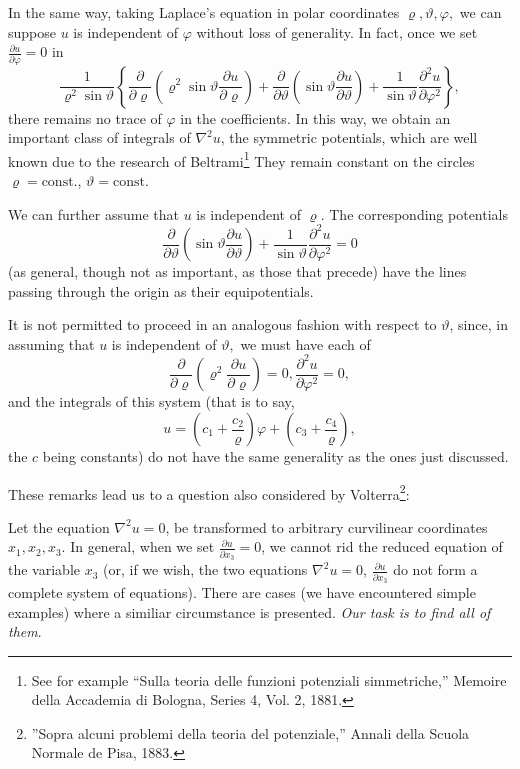 \documentclass{book}
\begin{document}
In the same way, taking Laplace's equation in polar coordinates $\varrho,\vartheta,\varphi,$ we can suppose $u$ is independent of $\varphi$ without loss of generality. In fact, once we set $\displaystyle\frac{\partial u}{\partial\varphi}=0$ in
$$\frac{1}{\varrho^2\sin\vartheta}\left\{\frac{\partial}{\partial\varrho}\left(\varrho^2\sin\vartheta\frac{\partial u}{\partial\varrho}\right)+\frac{\partial}{\partial\vartheta}\left(\sin\vartheta\frac{\partial u}{\partial\vartheta}\right)+\frac{1}{\sin\vartheta}\frac{\partial^2u}{\partial\varphi^2}\right\},$$ 
there remains no trace of $\varphi$ in the coefficients. In this way, we obtain an important class of integrals of $\nabla^2u$, the symmetric potentials, which are well known due to the research of Beltrami\footnote{See for example ``Sulla teoria delle funzioni potenziali simmetriche,'' Memoire della Accademia di Bologna, Series 4, Vol. 2, 1881.} They remain constant on the circles $\varrho=\text{const.}$, $\vartheta=\text{const.}$ 

We can further assume that $u$ is independent of $\varrho.$ The corresponding potentials 
$$\frac{\partial}{\partial\vartheta}\left(\sin\vartheta\frac{\partial u}{\partial\vartheta}\right)+\frac{1}{\sin\vartheta}\frac{\partial^2u}{\partial\varphi^2}=0$$
(as general, though not as important, as those that precede) have the lines passing through the origin as their equipotentials.

It is not permitted to proceed in an analogous fashion with respect to $\vartheta$, since, in assuming that $u$ is independent of $\vartheta,$ we must have each of
$$\frac{\partial}{\partial\varrho}\left(\varrho^2\frac{\partial u}{\partial\varrho}\right)=0, \frac{\partial^2u}{\partial\varphi^2}=0,$$
and the integrals of this system (that is to say,
$$u=\left(c_1+\frac{c_2}{\varrho}\right)\varphi+\left(c_3+\frac{c_4}{\varrho}\right),$$
the $c$ being constants) do not have the same generality as the ones just discussed. 

These remarks lead us to a question also considered by Volterra\footnote{''Sopra alcuni problemi della teoria del potenziale,'' Annali della Scuola Normale de Pisa, 1883.}:

Let the equation $\nabla^2u=0$, be transformed to arbitrary curvilinear coordinates $x_1,x_2,x_3$. In general, when we set $\displaystyle\frac{\partial u}{\partial x_3}=0$, we cannot rid the reduced equation of the variable $x_3$ (or, if we wish, the two equations $\nabla^2u=0$, $\frac{\partial u}{\partial x_3}$ do not form a complete system of equations). There are cases (we have encountered simple examples) where a similiar circumstance is presented. \emph{Our task is to find all of them}. 
\end{document}
